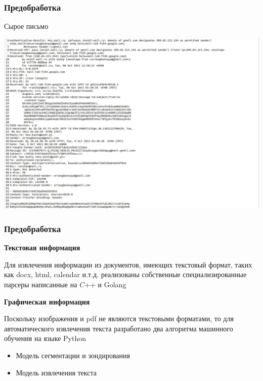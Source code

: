 \documentclass[compress,professionalfont]{beamer}
\begin{document}
\begin{frame}
\frametitle{Предобработка}

Сырое письмо
\begin{center}
\includegraphics[width=.9\textwidth]{eml_raw.jpg}
\end{center}

\end{frame}

\begin{frame}
\frametitle{Предобработка}

\textbf{Текстовая информация}

Для извлечения информации из документов, имеющих текстовый формат, таких как docx, html, calendar и.т.д. реализованы собственные специализированные парсеры написанные на $C$++ и Golang

\textbf{Графическая информация}

Поскольку изображения и pdf не являются текстовыми форматами, то
для автоматического извлечения текста разработано два алгоритма машинного обучения на языке Python
\begin{itemize}
\item Модель сегментации и зондирования
\item Модель извлечения текста
\end{itemize}

\end{frame}
\end{document}
